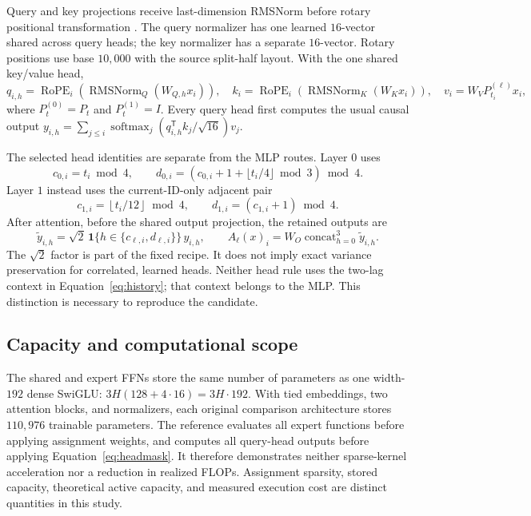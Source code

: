 \documentclass{article}
\newcommand{\RMS}{\operatorname{RMSNorm}}
\newcommand{\RoPE}{\operatorname{RoPE}}
\newcommand{\softmax}{\operatorname{softmax}}
\newcommand{\Ind}{\mathbf{1}}
\begin{document}
Query and key projections receive last-dimension RMSNorm before rotary positional transformation \citep{su2021roformer}. The query normalizer has one learned $16$-vector shared across query heads; the key normalizer has a separate $16$-vector. Rotary positions use base $10{,}000$ with the source split-half layout. With the one shared key/value head,
\begin{equation}
 q_{i,h}=\RoPE_i(\RMS_Q(W_{Q,h}x_i)),\quad
 k_i=\RoPE_i(\RMS_K(W_Kx_i)),\quad
 v_i=W_VP^{(\ell)}_{t_i}x_i,
\end{equation}
where $P^{(0)}_t=P_t$ and $P^{(1)}_t=I$. Every query head first computes the usual causal output $y_{i,h}=\sum_{j\le i}\softmax_j(q_{i,h}^{\mathsf T}k_j/\sqrt{16})v_j$.

The selected head identities are separate from the MLP routes. Layer $0$ uses
\begin{equation}
 c_{0,i}=t_i\bmod4,\qquad
 d_{0,i}=\left(c_{0,i}+1+\lfloor t_i/4\rfloor\bmod3\right)\bmod4.
\end{equation}
Layer $1$ instead uses the current-ID-only adjacent pair
\begin{equation}
 c_{1,i}=\left\lfloor t_i/12\right\rfloor\bmod4,\qquad
 d_{1,i}=(c_{1,i}+1)\bmod4.
 \label{eq:head1}
\end{equation}
After attention, before the shared output projection, the retained outputs are
\begin{equation}
 \widetilde y_{i,h}=\sqrt{2}\,
 \Ind\{h\in\{c_{\ell,i},d_{\ell,i}\}\}\,y_{i,h},\qquad
 A_\ell(x)_i=W_O\operatorname{concat}_{h=0}^{3}\widetilde y_{i,h}.
 \label{eq:headmask}
\end{equation}
The $\sqrt2$ factor is part of the fixed recipe. It does not imply exact variance preservation for correlated, learned heads. Neither head rule uses the two-lag context in Equation~\ref{eq:history}; that context belongs to the MLP. This distinction is necessary to reproduce the candidate.

\subsection{Capacity and computational scope}
The shared and expert FFNs store the same number of parameters as one width-$192$ dense SwiGLU: $3H(128+4\cdot16)=3H\cdot192$. With tied embeddings, two attention blocks, and normalizers, each original comparison architecture stores $110{,}976$ trainable parameters. The reference evaluates all expert functions before applying assignment weights, and computes all query-head outputs before applying Equation~\ref{eq:headmask}. It therefore demonstrates neither sparse-kernel acceleration nor a reduction in realized FLOPs. Assignment sparsity, stored capacity, theoretical active capacity, and measured execution cost are distinct quantities in this study.
\end{document}
